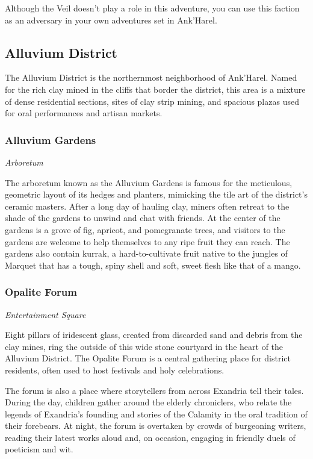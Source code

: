 \documentclass[10pt,a4paper,twoside,fancy,bg=print,twocolumn,openany,nodeprecatedcode]{dndbook}
\begin{document}
Although the Veil doesn't play a role in this adventure, you can use this faction as an adversary in your own adventures set in Ank'Harel.

\subsection{Alluvium District}
The Alluvium District is the northernmost neighborhood of Ank'Harel. Named for the rich clay mined in the cliffs that border the district, this area is a mixture of dense residential sections, sites of clay strip mining, and spacious plazas used for oral performances and artisan markets.

\subsubsection{Alluvium Gardens}
\textit{Arboretum}

The arboretum known as the Alluvium Gardens is famous for the meticulous, geometric layout of its hedges and planters, mimicking the tile art of the district's ceramic masters. After a long day of hauling clay, miners often retreat to the shade of the gardens to unwind and chat with friends. At the center of the gardens is a grove of fig, apricot, and pomegranate trees, and visitors to the gardens are welcome to help themselves to any ripe fruit they can reach. The gardens also contain kurrak, a hard-to-cultivate fruit native to the jungles of Marquet that has a tough, spiny shell and soft, sweet flesh like that of a mango.

\subsubsection{Opalite Forum}
\textit{Entertainment Square}

Eight pillars of iridescent glass, created from discarded sand and debris from the clay mines, ring the outside of this wide stone courtyard in the heart of the Alluvium District. The Opalite Forum is a central gathering place for district residents, often used to host festivals and holy celebrations.

The forum is also a place where storytellers from across Exandria tell their tales. During the day, children gather around the elderly chroniclers, who relate the legends of Exandria's founding and stories of the Calamity in the oral tradition of their forebears. At night, the forum is overtaken by crowds of burgeoning writers, reading their latest works aloud and, on occasion, engaging in friendly duels of poeticism and wit.
\end{document}
